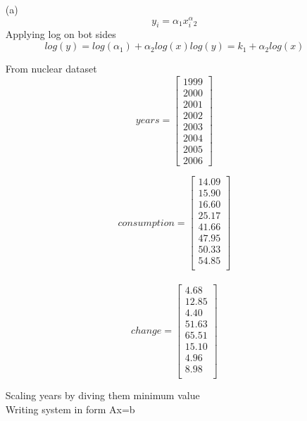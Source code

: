 \documentclass[unicode,11pt,a4paper,oneside,numbers=endperiod,openany]{scrartcl}
\begin{document}
\begin{itemize}
	\item [(a)]
	\begin{equation}
	y_i = \alpha_1x_i^\alpha_2
	\end{equation}
	{Applying log on bot sides}\\
	
	\begin{equation}
	log(y) = log(\alpha_1) + \alpha_2log(x)
	log(y) = k_1 + \alpha_2log(x)
	\end{equation}
	

	{From nuclear dataset}\\
	
	\[ years = 
	\begin{bmatrix}
	1999  \\
	2000  \\
	2001  \\
	2002  \\
	2003  \\
	2004  \\
	2005  \\
	2006
	\end{bmatrix}
	\]
	
	\[  consumption = 
        \begin{bmatrix}
        14.09 \\
        15.90 \\
     	16.60 \\
        25.17 \\
        41.66 \\
        47.95 \\
        50.33 \\
        54.85 \\
        \end{bmatrix}
    \]
    \\
    \[  change = 
        \begin{bmatrix}
        4.68 \\
        12.85 \\
        4.40 \\
        51.63 \\
        65.51 \\
        15.10 \\
        4.96 \\
        8.98 \\

        \end{bmatrix}
    \]
    
    {Scaling years by diving them minimum value}\\
    {Writing system in form Ax=b}\\
	

\end{itemize}
\end{document}
